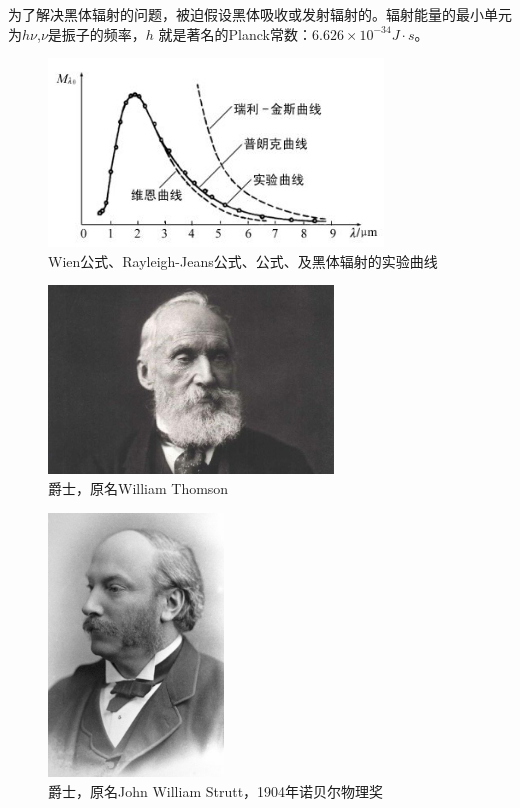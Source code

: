 为了解决黑体辐射的问题，\planck 被迫假设黑体吸收或发射辐射的。辐射能量的最小单元为$h\nu$,$\nu$是振子的频率，$h$ 就是著名的Planck常数：$ 6.626 \times 10^{-34} J \cdot s$。

\begin{figure}[!ht]
\centering
\includegraphics[height=5cm]{pic/black_body_radiation_lambda.jpg}
\caption{Wien公式、Rayleigh-Jeans公式、\planck 公式、及黑体辐射的实验曲线}
\end{figure}

\begin{figure}[!ht]
\centering
\includegraphics[height=5cm]{pic/Kelvine.jpg}
\caption{\kelv 爵士，原名William Thomson}
\end{figure}

\begin{figure}[!ht]
\centering
\includegraphics[height=7cm]{pic/Rayleigh.jpg}
\caption{\rayleigh 爵士，原名John William Strutt，1904年诺贝尔物理奖}
\end{figure}

